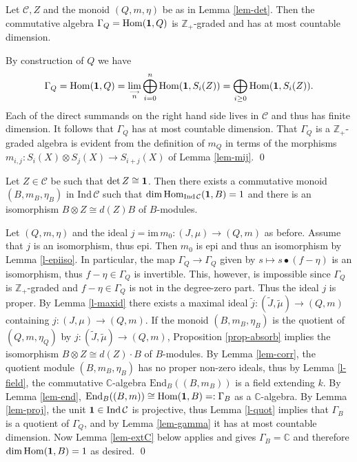 \documentclass[11pt]{article}
\theoremstyle{definition}
\theoremstyle{definition}
\theoremstyle{remark}
\def\2#1{{\mathcal #1}}
\def\7#1{{\mathbb #1}}
\def\1#1{{\bf #1}}
\newcommand{\Hom}{\mathrm{Hom}}
\newcommand{\End}{\mathrm{End}}
\newcommand{\rarr}{\rightarrow}
\begin{document}
\blemma  \label{lem-gamma}
Let $\2C, Z$ and the monoid $(Q,m,\eta)$ be as in Lemma \ref{lem-det}. Then the
commutative algebra $\Gamma_Q=\Hom(\11,Q)$ is $\7Z_+$-graded and has at most countable dimension.
\elemma

\prf By construction of $Q$ we have
\[ \Gamma_Q=\Hom(\11,Q)=\lim_{\stackrel{\longrightarrow}{n}}\bigoplus_{i=0}^n\Hom(\11,S_i(Z))
   =\bigoplus_{i\ge 0}\Hom(\11,S_i(Z)). \] 
Each of the direct summands on the right hand side lives in $\2C$ and thus has finite dimension. It
follows that $\Gamma_Q$ has at most countable dimension. That $\Gamma_Q$ is a $\7Z_+$-graded algebra
is evident from the definition of $m_Q$ in terms of the morphisms 
$m_{i,j}: S_i(X)\otimes S_j(X)\rarr S_{i+j}(X)$ of Lemma \ref{lem-mij}.
\qed

\btheor \label{theor-absorb}
Let $Z\in\2C$ be such that $\det Z\cong\11$. Then there exists a commutative monoid $(B,m_B,\eta_B)$ 
in $\mathrm{Ind}\,\2C$ such that $\dim\Hom_{\mathrm{Ind}\,\2C}(\11,B)=1$ and there is an isomorphism 
$B\otimes Z\cong d(Z)B$ of $B$-modules.
\etheor

\prf Let $(Q,m,\eta)$ and the ideal $j=\mathrm{im}\,m_0:(J,\mu)\rarr(Q,m)$ as before. Assume that
$j$ is an isomorphism, thus epi. Then $m_0$ is epi and thus an isomorphism by Lemma
\ref{l-epiiso}. In particular, the map $\Gamma_Q\rarr\Gamma_Q$ given by $s\mapsto s\bullet(f-\eta)$ 
is an isomorphism, thus $f-\eta\in\Gamma_Q$ is invertible. This, however, is impossible since
$\Gamma_Q$ is $\7Z_+$-graded and $f-\eta\in\Gamma_Q$ is not in the degree-zero part. Thus the ideal
$j$ is proper. By Lemma \ref{l-maxid} there exists a maximal ideal
$\widetilde{j}:(\widetilde{J},\widetilde{\mu})\rarr(Q,m)$ 
containing $j:(J,\mu)\rarr(Q,m)$. If the monoid $(B,m_B,\eta_B)$ is the quotient of $(Q,m,\eta_Q)$
by $j:(\widetilde{J},\widetilde{\mu})\rarr(Q,m)$, Proposition \ref{prop-absorb} implies the
isomorphism $B\otimes Z\cong d(Z)\cdot B$ of $B$-modules. By Lemma \ref{lem-corr}, the quotient 
module $(B,m_B,\eta_B)$ has no proper non-zero ideals, thus by Lemma \ref{l-field}, the commutative
$\7C$-algebra $\End_B((B,m_B))$ is a field extending $k$. By Lemma \ref{lem-end}, 
$\End_B((B,m))\cong\Hom(\11,B)=:\Gamma_B$ as a $\7C$-algebra. By Lemma \ref{lem-proj}, the unit
$\11\in\mathrm{Ind}\,\2C$ is projective, thus Lemma \ref{l-quot} implies that $\Gamma_B$ is a
quotient of $\Gamma_Q$, and by Lemma \ref{lem-gamma} it has at most countable dimension. Now Lemma
\ref{lem-extC} below applies and gives $\Gamma_B=\7C$ and therefore $\dim\Hom(\11,B)=1$ as desired. 
\qed
\end{document}
